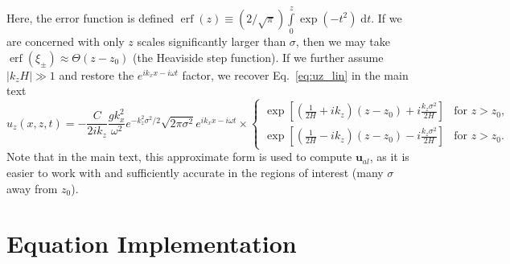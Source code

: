 \documentclass[
        fleqn,
        usenatbib,
    ]{mnras}
\newcommand*{\abs}[1]{\left|#1\right|}
\newcommand*{\p}[1]{\left(#1\right)}
\newcommand*{\s}[1]{\left[#1\right]}
\newcommand*{\bm}[1]{\mathbf{#1}}
\DeclareMathOperator*{\erf}{erf}
\begin{document}
Here, the error function is defined $\erf(z) \equiv
\p{2/\sqrt{\pi}}\int\limits_0^z \exp\p{-t^2}\;\mathrm{d}t$. If we are concerned
with only $z$ scales significantly larger than $\sigma$, then we may take
$\erf(\xi_{\pm}) \approx \Theta(z - z_0)$ (the Heaviside step function). If we
further assume $\abs{k_zH} \gg 1$ and restore the $e^{ik_xx - i\omega t}$
factor, we recover Eq.~\eqref{eq:uz_lin} in the main text
\begin{equation}
    u_{z}(x, z, t) = -\frac{C}{2ik_z}\frac{gk_x^2}{\omega^2}
        e^{-k_z^2\sigma^2 / 2}
        \sqrt{2\pi \sigma^2} e^{ik_xx - i\omega t} \times
    \begin{cases}
        \exp\s{\p{\frac{1}{2H} + ik_z}\p{z - z_0} + i\frac{k_z\sigma^2}{2H}}
            & \text{for }z > z_0,\\[5pt]
        \exp\s{\p{\frac{1}{2H} - ik_z}\p{z - z_0} - i\frac{k_z\sigma^2}{2H}}
            & \text{for }z > z_0.
    \end{cases}
\end{equation}
Note that in the main text, this approximate form is used to compute
$\bm{u}_{al}$, as it is easier to work with and sufficiently accurate in the
regions of interest (many $\sigma$ away from $z_0$).

\section{Equation Implementation}\label{se:strat_impl}
\end{document}
